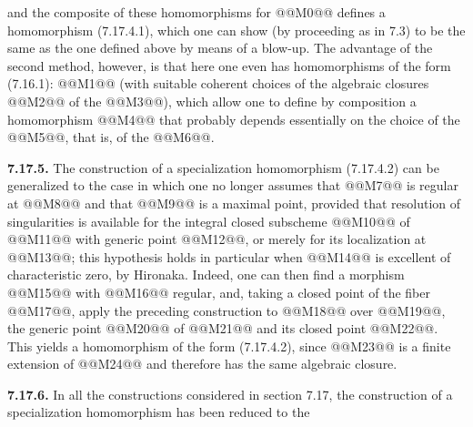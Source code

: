 and the composite of these homomorphisms for @@M0@@ defines a homomorphism (7.17.4.1), which one can show (by proceeding as in 7.3) to be the same as the one defined above by means of a blow-up. The advantage of the second method, however, is that here one even has homomorphisms of the form (7.16.1):
@@M1@@
(with suitable coherent choices of the algebraic closures @@M2@@ of the @@M3@@), which allow one to define by composition a homomorphism
@@M4@@
that probably depends essentially on the choice of the @@M5@@, that is, of the @@M6@@.

\textbf{7.17.5.} The construction of a specialization homomorphism (7.17.4.2) can be generalized to the case in which one no longer assumes that @@M7@@ is regular at @@M8@@ and that @@M9@@ is a maximal point, provided that resolution of singularities is available for the integral closed subscheme @@M10@@ of @@M11@@ with generic point @@M12@@, or merely for its localization at @@M13@@; this hypothesis holds in particular when @@M14@@ is excellent of characteristic zero, by Hironaka. Indeed, one can then find a morphism @@M15@@ with @@M16@@ regular, and, taking a closed point of the fiber @@M17@@, apply the preceding construction to @@M18@@ over @@M19@@, the generic point @@M20@@ of @@M21@@ and its closed point @@M22@@. This yields a homomorphism of the form (7.17.4.2), since @@M23@@ is a finite extension of @@M24@@ and therefore has the same algebraic closure.

\textbf{7.17.6.} In all the constructions considered in section 7.17, the construction of a specialization homomorphism has been reduced to the
